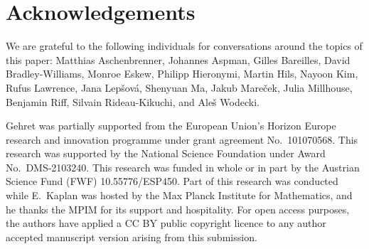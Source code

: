 \documentclass[11pt]{amsart}
\theoremstyle{plain}
\theoremstyle{definition}
\numberwithin{equation}{section}
\newcommand\0{\varnothing}
\begin{document}
\section*{Acknowledgements}
\noindent
We are grateful to the following individuals for conversations around the topics of this paper: Matthias Aschenbrenner, Johannes Aspman, Gilles Bareilles, David Bradley-Williams, Monroe Eskew,  Philipp Hieronymi, Martin Hils, Nayoon Kim, Rufus Lawrence, Jana Lep\v{s}ov\'{a}, Shenyuan Ma, Jakub Mare\v{c}ek, Julia Millhouse, Benjamin Riff, Silvain Rideau-Kikuchi, and Ale\v{s} Wodecki.


\medskip\noindent
Gehret was partially supported from the European Union’s Horizon Europe research and innovation programme under grant agreement No.~101070568. 
This research was supported by the National Science Foundation under Award No.\ DMS-2103240.
This research was funded in whole or in part by the Austrian Science Fund (FWF) 10.55776/ESP450. Part of this research was conducted while E.\ Kaplan was hosted by the Max Planck Institute for Mathematics, and he thanks the MPIM for its support and hospitality. 
For open access purposes, the authors have applied a CC BY public copyright licence to any author accepted manuscript version arising from this submission.

%	
%
\end{document}
